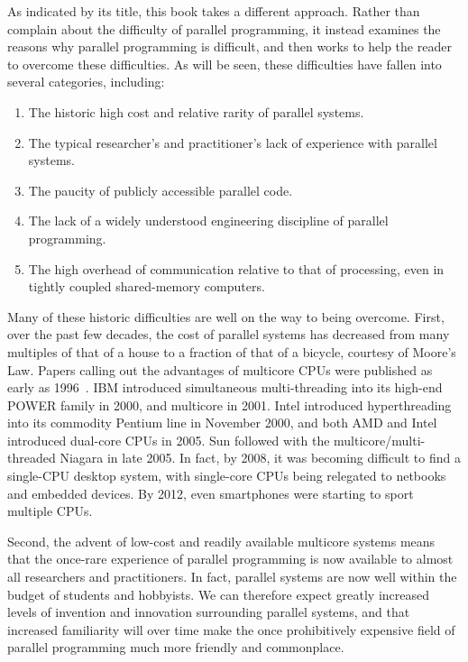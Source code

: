 As indicated by its title, this book takes a different approach.
Rather than complain about the difficulty of parallel programming,
it instead examines the reasons why parallel programming is
difficult, and then works to help the reader to overcome these
difficulties.
As will be seen, these difficulties have fallen into several categories,
including:

\begin{enumerate}
\item	The historic high cost and relative rarity of parallel systems.
\item	The typical researcher's and practitioner's lack of experience
	with parallel systems.
\item	The paucity of publicly accessible parallel code.
\item	The lack of a widely understood engineering discipline of
	parallel programming.
\item	The high overhead of communication relative to that of processing,
	even in tightly coupled shared-memory computers.
\end{enumerate}

Many of these historic difficulties are well on the way to being overcome.
First, over the past few decades, the cost of parallel systems
has decreased from many multiples of that of a house to a fraction of
that of a bicycle, courtesy of Moore's Law.
Papers calling out the advantages of multicore CPUs were published
as early as 1996~\cite{Olukotun96}.
IBM introduced simultaneous multi-threading
into its high-end POWER family in 2000, and multicore in 2001.
Intel introduced hyperthreading into its commodity Pentium line in
November 2000, and both AMD and Intel introduced
dual-core CPUs in 2005.
Sun followed with the multicore/multi-threaded Niagara in late 2005.
In fact, by 2008, it was becoming difficult
to find a single-CPU desktop system, with single-core CPUs being
relegated to netbooks and embedded devices.
By 2012, even smartphones were starting to sport multiple CPUs.

Second, the advent of low-cost and readily available multicore systems
means that the once-rare experience of parallel programming is
now available to almost all researchers and practitioners.
In fact, parallel systems are now well within the budget of students
and hobbyists.
We can therefore expect greatly increased levels of invention and
innovation surrounding parallel systems, and that increased familiarity
will over time make the once prohibitively expensive field of parallel
programming much more friendly and commonplace.


